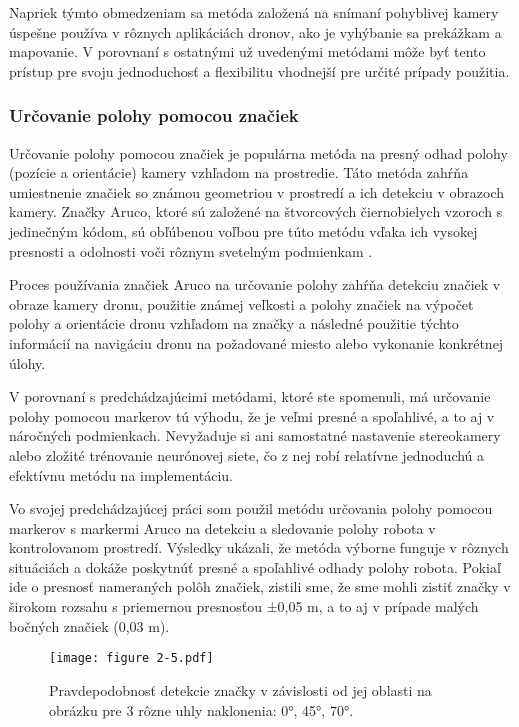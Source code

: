 Napriek týmto obmedzeniam sa metóda založená na snímaní pohyblivej kamery úspešne používa v rôznych aplikáciách dronov, ako je vyhýbanie sa prekážkam a mapovanie. V porovnaní s ostatnými už uvedenými metódami môže byť tento prístup pre svoju jednoduchosť a flexibilitu vhodnejší pre určité prípady použitia.

\subsubsection{Určovanie polohy pomocou značiek}
Určovanie polohy pomocou značiek je populárna metóda na presný odhad polohy (pozície a orientácie) kamery vzhľadom na prostredie. Táto metóda zahŕňa umiestnenie značiek so známou geometriou v prostredí a ich detekciu v obrazoch kamery. Značky Aruco, ktoré sú založené na štvorcových čiernobielych vzoroch s jedinečným kódom, sú obľúbenou voľbou pre túto metódu vďaka ich vysokej presnosti a odolnosti voči rôznym svetelným podmienkam \citep{Marut2019}.

Proces používania značiek Aruco na určovanie polohy zahŕňa detekciu značiek v obraze kamery dronu, použitie známej veľkosti a polohy značiek na výpočet polohy a orientácie dronu vzhľadom na značky a následné použitie týchto informácií na navigáciu dronu na požadované miesto alebo vykonanie konkrétnej úlohy.

V porovnaní s predchádzajúcimi metódami, ktoré ste spomenuli, má určovanie polohy pomocou markerov tú výhodu, že je veľmi presné a spoľahlivé, a to aj v náročných podmienkach. Nevyžaduje si ani samostatné nastavenie stereokamery alebo zložité trénovanie neurónovej siete, čo z nej robí relatívne jednoduchú a efektívnu metódu na implementáciu. 

Vo svojej predchádzajúcej práci som použil metódu určovania polohy pomocou markerov s markermi Aruco na detekciu a sledovanie polohy robota v kontrolovanom prostredí. Výsledky ukázali, že metóda výborne funguje v rôznych situáciách a dokáže poskytnúť presné a spoľahlivé odhady polohy robota. Pokiaľ ide o presnosť nameraných polôh značiek, zistili sme, že sme mohli zistiť značky v širokom rozsahu s priemernou presnosťou ±0,05 m, a to aj v prípade malých bočných značiek (0,03 m). 

\begin{figure}[ht!]
    \centering
    \texttt{[image: figure 2-5.pdf]}
    \caption{Pravdepodobnosť detekcie značky v závislosti od jej oblasti na obrázku pre 3 rôzne uhly naklonenia: 0°, 45°, 70°.}
    \label{o:2-5}
\end{figure}

